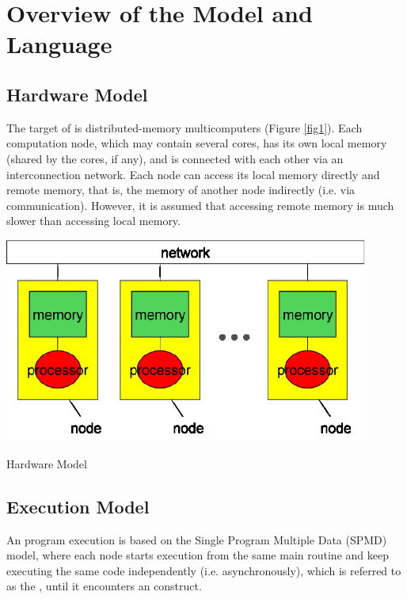 \chapter{Overview of the {\XMP} Model and Language}

\section{Hardware Model}

The target of {\XMP} is distributed-memory multicomputers (Figure
\ref{fig1}). Each computation node, which may contain several cores, has
its own local memory (shared by the cores, if any), and is connected
with each other via an interconnection network.
%
Each node can access its local memory directly and remote memory, that
is, the memory of another node indirectly (i.e. via
communication). However, it is assumed that accessing remote memory is 
much slower than accessing local memory.

\begin{myfigure}
\includegraphics[width=12cm]{figs/Fig1.eps}
  \caption{Hardware Model}\label{fig1}
\end{myfigure}

\section{Execution Model}

An {\XMP} program execution is based on the Single Program Multiple Data
(SPMD) model, where each node starts execution from the same main
routine and keep executing the same code independently
(i.e. asynchronously), which is referred to as the {\it {}}, until it encounters an {\XMP} construct.

%

